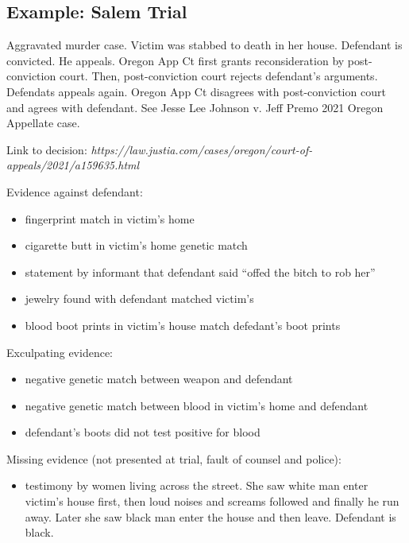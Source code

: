 \documentclass[
  10pt,
  dvipsnames,enabledeprecatedfontcommands]{scrartcl}
\providecommand{\tightlist}{%
  \setlength{\itemsep}{0pt}\setlength{\parskip}{0pt}}
\begin{document}
\hypertarget{example-salem-trial}{%
\subsection{Example: Salem Trial}\label{example-salem-trial}}


Aggravated murder case. Victim was stabbed to death in her house.
Defendant is convicted. He appeals. Oregon App Ct first grants
reconsideration by post-conviction court. Then, post-conviction court
rejects defendant's arguments. Defendats appeals again. Oregon App Ct
disagrees with post-conviction court and agrees with defendant. See
Jesse Lee Johnson v. Jeff Premo 2021 Oregon Appellate case.

Link to decision:
\textit{https://law.justia.com/cases/oregon/court-of-appeals/2021/a159635.html}

Evidence against defendant:

\begin{itemize}
\item
  fingerprint match in victim's home
\item
  cigarette butt in victim's home genetic match
\item
  statement by informant that defendant said ``offed the bitch to rob
  her''
\item
  jewelry found with defendant matched victim's
\item
  blood boot prints in victim's house match defedant's boot prints
\end{itemize}

Exculpating evidence:

\begin{itemize}
\item
  negative genetic match between weapon and defendant
\item
  negative genetic match between blood in victim's home and defendant
\item
  defendant's boots did not test positive for blood
\end{itemize}

Missing evidence (not presented at trial, fault of counsel and police):

\begin{itemize}
\tightlist
\item
  testimony by women living across the street. She saw white man enter
  victim's house first, then loud noises and screams followed and
  finally he run away. Later she saw black man enter the house and then
  leave. Defendant is black.
\end{itemize}
\end{document}
